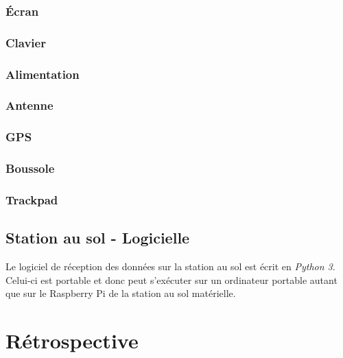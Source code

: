 \subsubsection{Écran}



\subsubsection{Clavier}



\subsubsection{Alimentation}



\subsubsection{Antenne}



\subsubsection{GPS}



\subsubsection{Boussole}



\subsubsection{Trackpad}



\subsection{Station au sol - Logicielle}

Le logiciel de réception des données sur la station au sol est écrit en
\textit{Python 3}. Celui-ci est portable et donc peut s'exécuter sur un
ordinateur portable autant que sur le Raspberry Pi de la station au sol
matérielle.

\section{Rétrospective}

